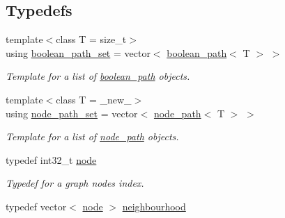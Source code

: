 \subsection*{Typedefs}
\begin{DoxyCompactItemize}
\item 
{\footnotesize template$<$class T  = size\+\_\+t$>$ }\\using \hyperlink{namespacelgraph_1_1utils_aaf50131e15d771a45620336d6e7a77f8}{boolean\+\_\+path\+\_\+set} = vector$<$ \hyperlink{classlgraph_1_1utils_1_1boolean__path}{boolean\+\_\+path}$<$ T $>$ $>$\hypertarget{namespacelgraph_1_1utils_aaf50131e15d771a45620336d6e7a77f8}{}\label{namespacelgraph_1_1utils_aaf50131e15d771a45620336d6e7a77f8}

\begin{DoxyCompactList}\small\item\em Template for a list of \hyperlink{classlgraph_1_1utils_1_1boolean__path}{boolean\+\_\+path} objects. \end{DoxyCompactList}\item 
{\footnotesize template$<$class T  = \+\_\+new\+\_\+$>$ }\\using \hyperlink{namespacelgraph_1_1utils_a723c115f9865edfab11a90377b9abef4}{node\+\_\+path\+\_\+set} = vector$<$ \hyperlink{classlgraph_1_1utils_1_1node__path}{node\+\_\+path}$<$ T $>$ $>$\hypertarget{namespacelgraph_1_1utils_a723c115f9865edfab11a90377b9abef4}{}\label{namespacelgraph_1_1utils_a723c115f9865edfab11a90377b9abef4}

\begin{DoxyCompactList}\small\item\em Template for a list of \hyperlink{classlgraph_1_1utils_1_1node__path}{node\+\_\+path} objects. \end{DoxyCompactList}\item 
typedef int32\+\_\+t \hyperlink{namespacelgraph_1_1utils_ab9c6b34241f0b68372c55f34c460e863}{node}\hypertarget{namespacelgraph_1_1utils_ab9c6b34241f0b68372c55f34c460e863}{}\label{namespacelgraph_1_1utils_ab9c6b34241f0b68372c55f34c460e863}

\begin{DoxyCompactList}\small\item\em Typedef for a graph node\textquotesingle{}s index. \end{DoxyCompactList}\item 
typedef vector$<$ \hyperlink{namespacelgraph_1_1utils_ab9c6b34241f0b68372c55f34c460e863}{node} $>$ \hyperlink{namespacelgraph_1_1utils_ac52fa2c52f47820841e83a3da5d308bc}{neighbourhood}\hypertarget{namespacelgraph_1_1utils_ac52fa2c52f47820841e83a3da5d308bc}{}\label{namespacelgraph_1_1utils_ac52fa2c52f47820841e83a3da5d308bc}


\end{DoxyCompactItemize}
